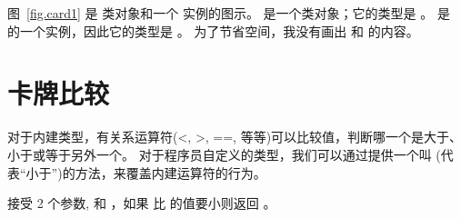 
图~\ref{fig.card1} 是  类对象和一个  实例的图示。  是一个类对象；它的类型是  。  是  的一个实例，因此它的类型是 。 为了节省空间，我没有画出  和  的内容。

  
  


\section{卡牌比较}

\label{comparecard}


对于内建类型，有关系运算符(<, >, ==, 等等)可以比较值，判断哪一个是大于、小于或等于另外一个。
对于程序员自定义的类型，我们可以通过提供一个叫  (代表“小于”)的方法，来覆盖内建运算符的行为。



 接受 2 个参数,  和 ，如果  比  的值要小则返回  。



